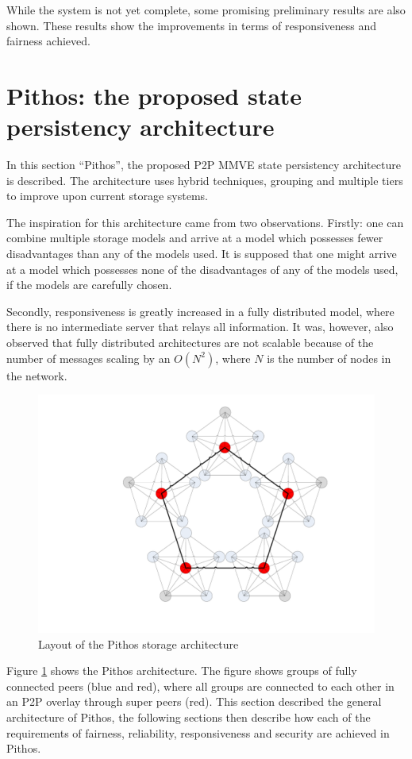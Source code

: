 \documentclass[10pt,a4paper,conference]{IEEEtran}
\begin{document}
While the system is not yet complete, some promising preliminary results are also shown. These results show the improvements in terms of
responsiveness and fairness achieved.

\section{Pithos: the proposed state persistency architecture}
\label{proposed_model}

In this section ``Pithos'', the proposed P2P MMVE state persistency architecture is described. The architecture uses hybrid techniques, grouping and
multiple tiers to improve upon current storage systems.

The inspiration for this architecture came from two observations. Firstly: one can combine multiple storage models and arrive at a model which
possesses fewer disadvantages than any of the models used. It is supposed that one might arrive at a model which possesses none of the disadvantages
of any of the models used, if the models are carefully chosen.

Secondly, responsiveness is greatly increased in a fully distributed model, where there is no intermediate server that relays all information. It
was, however, also observed that fully distributed architectures are not scalable because of the number of messages scaling by an $O(N^2)$, where $N$
is the number of nodes in the network.

\begin{figure}[htbp]
 \centering
 \includegraphics[clip=true, viewport=7.5cm 2.5cm 26cm 20cm, width=0.7\columnwidth]{CDHT_layout}
 \caption{Layout of the Pithos storage architecture}
 \label{fig_pithos}
\end{figure}
%
Figure \ref{fig_pithos} shows the Pithos architecture. The figure shows groups of fully connected peers (blue and red), where all groups are
connected to each other in an P2P overlay through super peers (red). This section described the general architecture of Pithos, the following
sections then describe how each of the requirements of fairness, reliability, responsiveness and security are achieved in Pithos.
\end{document}
